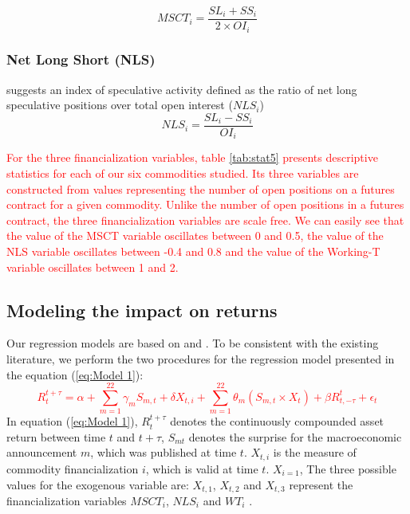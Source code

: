 \documentclass[12pt]{article}
\begin{document}
\begin{equation} \label{eqn:MSCT}
MSCT_i=\frac{SL_i+SS_i}{2 \times OI_i}
\end{equation}

\subsubsection{Net Long Short (NLS)}
\citet{hedegaard2011margins} suggests an index of speculative activity defined as the ratio of net long speculative positions over total open interest ($NLS_i$)
\begin{equation} \label{eqn:NLS}
NLS_i=\frac{SL_i-SS_i}{OI_i}
\end{equation}

\textcolor{red}{For the three financialization variables, table \ref{tab:stat5} presents descriptive statistics for each of our six commodities studied. Its three variables are constructed from values representing the number of open positions on a futures contract for a given commodity. Unlike the number of open positions in a futures contract, the three financialization variables are scale free. We can easily see that the value of the MSCT variable oscillates between 0 and 0.5, the value of the NLS variable oscillates between -0.4 and 0.8 and the value of the Working-T variable oscillates between 1 and 2.}


\subsection{Modeling the impact on returns}\label{return}

Our regression models are based on \citet{kurov2019price} and \citet{andersen2007real}. To be consistent with the existing literature, we perform the two procedures for the regression model presented in the equation (\ref{eq:Model 1}):
\textcolor{red}{
\begin{equation}\label{eq:Model 1}
R_{t}^{t+\tau}=\alpha+\sum_{m=1}^{22} \gamma_m S_{m,t}+ \delta X_{t,i} + \sum_{m=1}^{22} \theta_m (S_{m,t} \times X_t)+\beta R_{t,-\tau}^{t}+\epsilon_{t} 
\end{equation}
}
In equation (\ref{eq:Model 1}), $R_{t}^{t+\tau}$ denotes the continuously compounded asset return between time $t$ and $t+\tau$, $S_{mt}$ denotes the surprise for the macroeconomic announcement $m$, which was published at time $t$. $X_{t,i}$ is the measure of commodity financialization $i$,  which is valid at time $t$. $X_{i = 1}$, The three possible values for the exogenous variable are:  $X_{t,1}$, $X_{t,2}$ and $X_{t,3}$ represent the financialization variables $MSCT_i$, $NLS_i$ and $WT_i$ . 
\end{document}
